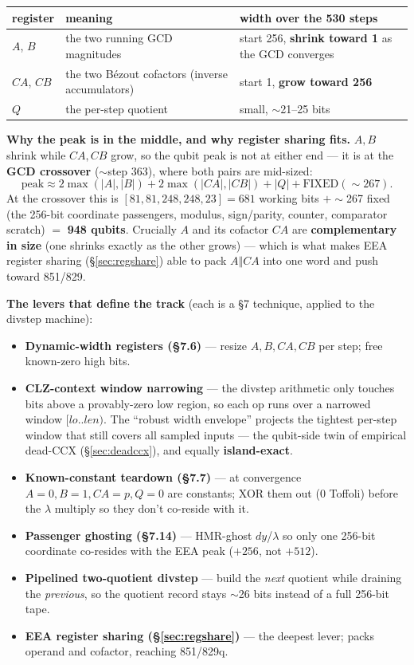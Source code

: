 \documentclass[11pt,a4paper]{article}
\begin{document}
\begin{center}
\begin{tabular}{p{2.0cm}p{5.0cm}p{6.0cm}}
\toprule
\textbf{register} & \textbf{meaning} & \textbf{width over the 530 steps} \\
\midrule
$A$, $B$ & the two running GCD magnitudes & start 256, \textbf{shrink toward 1} as the GCD converges \\
$CA$, $CB$ & the two B\'ezout cofactors (inverse accumulators) & start 1, \textbf{grow toward 256} \\
$Q$ & the per-step quotient & small, $\sim$21--25 bits \\
\bottomrule
\end{tabular}
\end{center}

\textbf{Why the peak is in the middle, and why register sharing fits.} $A,B$ shrink while $CA,CB$
grow, so the qubit peak is not at either end --- it is at the \textbf{GCD crossover} ($\sim$step 363),
where both pairs are mid-sized:
\[
  \text{peak} \approx 2\max(|A|,|B|) + 2\max(|CA|,|CB|) + |Q| + \text{FIXED}(\sim267).
\]
At the crossover this is $[81,81,248,248,23] = 681$ working bits $+ \sim$267 fixed (the 256-bit
coordinate passengers, modulus, sign/parity, counter, comparator scratch) $=$ \textbf{948 qubits}.
Crucially $A$ and its cofactor $CA$ are \textbf{complementary in size} (one shrinks exactly as the
other grows) --- which is what makes EEA register sharing (\S\ref{sec:regshare}) able to pack
$A\Vert CA$ into one word and push toward 851/829.

\textbf{The levers that define the track} (each is a \S7 technique, applied to the divstep machine):
\begin{itemize}
  \item \textbf{Dynamic-width registers (\S7.6)} --- resize $A,B,CA,CB$ per step; free known-zero
    high bits.
  \item \textbf{CLZ-context window narrowing} --- the divstep arithmetic only touches bits above a
    provably-zero low region, so each op runs over a narrowed window $[lo..len)$. The ``robust width
    envelope'' projects the tightest per-step window that still covers all sampled inputs --- the
    qubit-side twin of empirical dead-CCX (\S\ref{sec:deadccx}), and equally \textbf{island-exact}.
  \item \textbf{Known-constant teardown (\S7.7)} --- at convergence $A{=}0, B{=}1, CA{=}p, Q{=}0$ are
    constants; XOR them out (0 Toffoli) before the $\lambda$ multiply so they don't co-reside with it.
  \item \textbf{Passenger ghosting (\S7.14)} --- HMR-ghost $dy$/$\lambda$ so only one 256-bit
    coordinate co-resides with the EEA peak ($+256$, not $+512$).
  \item \textbf{Pipelined two-quotient divstep} --- build the \emph{next} quotient while draining the
    \emph{previous}, so the quotient record stays $\sim$26 bits instead of a full 256-bit tape.
  \item \textbf{EEA register sharing (\S\ref{sec:regshare})} --- the deepest lever; packs operand and
    cofactor, reaching 851/829q.
\end{itemize}
\end{document}
